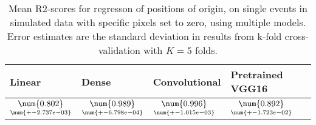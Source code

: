 \begin{table}
\centering
\caption{
Mean R2-scores for regresson of positions of origin, on single events in simulated data with specific pixels
set to zero, using multiple models. 
Error estimates are the standard deviation in results from k-fold cross-validation 
with $K=5$ folds.
}
\label{tab:regression-simulated-single-position-pixelmod-r2}
\begin{tabular}{llll}
\toprule
                                             Linear &                                               Dense &                                       Convolutional &                                    Pretrained VGG16 \\
\midrule
 $\underset{\num{+- 2.737e-03 }  }{\num{ 0.802 } }$ &  $\underset{\num{+- 6.798e-04 }  }{\num{ 0.989 } }$ &  $\underset{\num{+- 1.015e-03 }  }{\num{ 0.996 } }$ &  $\underset{\num{+- 1.723e-02 }  }{\num{ 0.892 } }$ \\
\bottomrule
\end{tabular}
\end{table}
